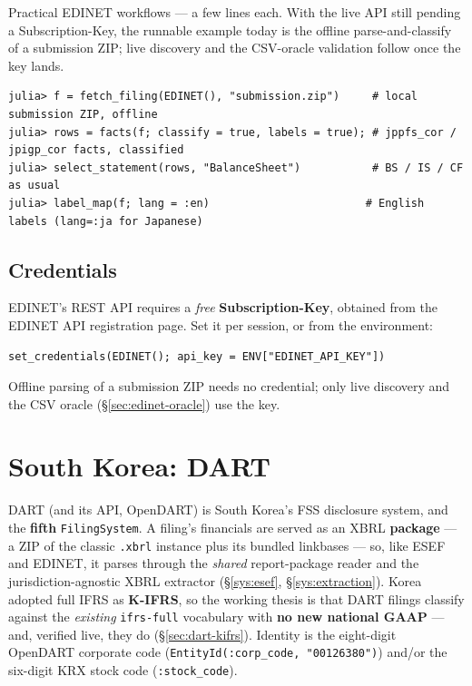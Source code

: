 \documentclass[11pt,a4paper]{report}
\begin{document}
Practical EDINET workflows --- a few lines each. With the live API still pending a Subscription-Key, the
runnable example today is the offline parse-and-classify of a submission ZIP; live discovery and the
CSV-oracle validation follow once the key lands.

\begin{lstlisting}
julia> f = fetch_filing(EDINET(), "submission.zip")     # local submission ZIP, offline
julia> rows = facts(f; classify = true, labels = true); # jppfs_cor / jpigp_cor facts, classified
julia> select_statement(rows, "BalanceSheet")           # BS / IS / CF as usual
julia> label_map(f; lang = :en)                        # English labels (lang=:ja for Japanese)
\end{lstlisting}

\begin{subappendices}
\section{Credentials}\label{sec:edinet-credentials}

EDINET's REST API requires a \emph{free} \textbf{Subscription-Key}, obtained from the EDINET API
registration page. Set it per session, or from the environment:

\begin{lstlisting}
set_credentials(EDINET(); api_key = ENV["EDINET_API_KEY"])
\end{lstlisting}

\noindent Offline parsing of a submission ZIP needs no credential; only live discovery and the CSV oracle
(\S\ref{sec:edinet-oracle}) use the key.
\end{subappendices}

\chapter{South Korea: DART}
\label{sys:dart}

DART (and its API, OpenDART) is South Korea's FSS disclosure system, and the \textbf{fifth}
\texttt{FilingSystem}. A filing's financials are served as an XBRL \textbf{package} --- a ZIP of the
classic \texttt{.xbrl} instance plus its bundled linkbases --- so, like ESEF and EDINET, it parses
through the \emph{shared} report-package reader and the jurisdiction-agnostic XBRL extractor
(\S\ref{sys:esef}, \S\ref{sys:extraction}). Korea adopted full IFRS as \textbf{K-IFRS}, so the working
thesis is that DART filings classify against the \emph{existing} \texttt{ifrs-full} vocabulary with
\textbf{no new national GAAP} --- and, verified live, they do (\S\ref{sec:dart-kifrs}). Identity is the
eight-digit OpenDART corporate code (\texttt{EntityId(:corp\_code,\ "00126380")}) and/or the six-digit
KRX stock code (\texttt{:stock\_code}).
\end{document}
